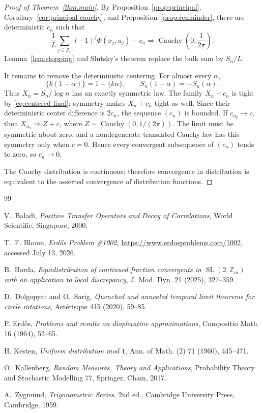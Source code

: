 \documentclass[11pt,a4paper]{amsart}
\theoremstyle{definition}
\theoremstyle{remark}
\begin{document}
\begin{proof}[Proof of Theorem~\ref{thm:main}]
By Proposition~\ref{prop:principal}, Corollary~\ref{cor:principal-cauchy},
and Proposition~\ref{prop:remainder}, there are deterministic $c_n$ such that
\begin{equation}\label{eq:centered-final}
 \frac1L\sum_{j\in\mathcal J_n}(-1)^j\Phi(x_j,u_j)-c_n
 \Longrightarrow \operatorname{Cauchy}\!\left(0,\frac1{2\pi}\right).
\end{equation}
Lemma~\ref{lem:stopping} and Slutsky's theorem replace the bulk sum by
$S_n/L$.

It remains to remove the deterministic centering.  For almost every
$\alpha$,
\[
 \{k(1-\alpha)\}=1-\{k\alpha\},
 \qquad S_n(1-\alpha)=-S_n(\alpha).
\]
Thus $X_n=S_n/\log n$ has an exactly symmetric law.  The family
$X_n-c_n$ is tight by \eqref{eq:centered-final}; symmetry makes
$X_n+c_n$ tight as well.  Since their deterministic center difference is
$2c_n$, the sequence $(c_n)$ is bounded.  If $c_{n_k}\to c$, then
$X_{n_k}\Rightarrow Z+c$, where
$Z\sim\operatorname{Cauchy}(0,1/(2\pi))$.  The limit must be symmetric about
zero, and a nondegenerate translated Cauchy law has this symmetry only when
$c=0$.  Hence every convergent subsequence of $(c_n)$ tends to zero, so
$c_n\to0$.

The Cauchy distribution is continuous; therefore convergence in distribution
is equivalent to the asserted convergence of distribution functions.
\end{proof}

\begin{thebibliography}{99}

V.~Baladi,
\emph{Positive Transfer Operators and Decay of Correlations},
World Scientific, Singapore, 2000.

T.~F. Bloom,
\emph{Erd\H{o}s Problem \#1002},
\url{https://www.erdosproblems.com/1002}, accessed July 13, 2026.

B.~Borda,
\emph{Equidistribution of continued fraction convergents in
$\operatorname{SL}(2,\mathbb Z_m)$ with an application to local discrepancy},
J. Mod. Dyn. 21 (2025), 327--359.

D.~Dolgopyat and O.~Sarig,
\emph{Quenched and annealed temporal limit theorems for circle rotations},
Ast\'erisque 415 (2020), 59--85.

P. Erd\H{o}s,
\emph{Problems and results on diophantine approximations},
Compositio Math. 16 (1964), 52--65.

H. Kesten,
\emph{Uniform distribution mod $1$},
Ann. of Math. (2) 71 (1960), 445--471.

O.~Kallenberg,
\emph{Random Measures, Theory and Applications},
Probability Theory and Stochastic Modelling 77,
Springer, Cham, 2017.

A.~Zygmund,
\emph{Trigonometric Series}, 2nd ed.,
Cambridge University Press, Cambridge, 1959.

\end{thebibliography}
\end{document}
